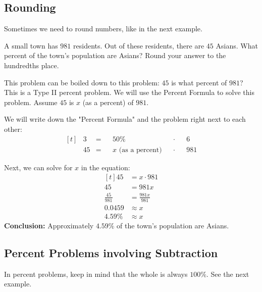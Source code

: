 \subsection{Rounding}
Sometimes we need to round numbers, like in the next example.
\begin{myexample}
A small town has $981$ residents. Out of these residents, there are $45$ Asians. What percent of the town's population are Asians? Round your answer to the hundredths place.
\end{myexample}
\begin{solution}

This problem can be boiled down to this problem: $45$ is what percent of $981$? This is a Type II percent problem. We will use the Percent Formula to solve this problem. Assume $45$ is $x$ (as a percent) of $981$.

We will write down the "Percent Formula" and the problem right next to each other:
\[
\begin{aligned}[t]
	&3 &= &&50\% &&\cdot &&6 \\
	&45 &= &&x \text{ (as a percent)} &&\cdot &&981
\end{aligned}
\]

Next, we can solve for $x$ in the equation:
\[
\begin{aligned}[t]
	45 &= x \cdot 981 \\
	45 &= 981x \\
	\frac{45}{981} &= \frac{981x}{981} \\
	0.0459 &\approx x \\
	4.59\% &\approx x
\end{aligned}
\]
\textbf{Conclusion:} Approximately $4.59\%$ of the town's population are Asians.

\end{solution}

\subsection{Percent Problems involving Subtraction}
In percent problems, keep in mind that the whole is always $100\%$. See the next example.

